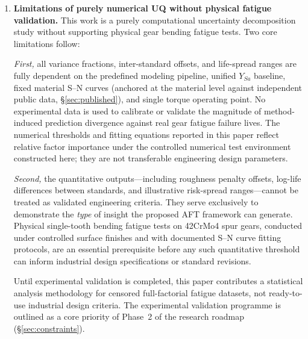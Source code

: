 \documentclass[twocolumn,12pt,a4paper]{article}
\begin{document}
\begin{enumerate}
        I nonetheless acknowledge that the non-informative censoring
        assumption cannot be formally tested with the available data. A
        rigorous assessment would require physical test data at multiple
        stress levels straddling the fatigue limit, or a sensitivity
        analysis under a pattern-mixture model that allows the censoring
        probability to depend on unobserved failure time. Both are
        deferred to the experimental validation programme outlined in
        Phase~2 (\S\ref{sec:constraints}).

  \item \textbf{Limitations of purely numerical UQ without physical
        fatigue validation.} This work is a purely computational
        uncertainty decomposition study without supporting physical gear
        bending fatigue tests. Two core limitations follow:

        \textit{First,} all variance fractions, inter-standard offsets,
        and life-spread ranges are fully dependent on the predefined
        modeling pipeline, unified $Y_{Sa}$ baseline, fixed material
        S--N curves (anchored at the material level against independent
        public data, \S\ref{sec:published}), and single torque operating
        point. No experimental
        data is used to calibrate or validate the magnitude of
        method-induced prediction divergence against real gear fatigue
        failure lives. The numerical thresholds and fitting equations
        reported in this paper reflect relative factor importance under
        the controlled numerical test environment constructed here; they
        are not transferable engineering design parameters.

        \textit{Second,} the quantitative outputs---including roughness
        penalty offsets, log-life differences between standards, and
        illustrative risk-spread ranges---cannot be treated as validated
        engineering criteria. They serve exclusively to demonstrate the
        \emph{type} of insight the proposed AFT framework can generate.
        Physical single-tooth bending fatigue tests on 42CrMo4 spur
        gears, conducted under controlled surface finishes and with
        documented S--N curve fitting protocols, are an essential
        prerequisite before any such quantitative threshold can inform
        industrial design specifications or standard revisions.

        Until experimental validation is completed, this paper
        contributes a statistical analysis methodology for censored
        full-factorial fatigue datasets, not ready-to-use industrial
        design criteria. The experimental validation programme is
        outlined as a core priority of Phase~2 of the research roadmap
        (\S\ref{sec:constraints}).


\end{enumerate}
\end{document}
